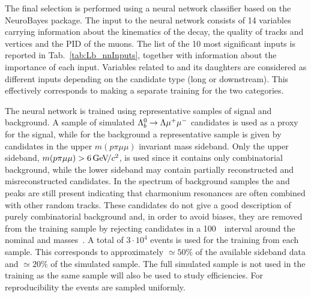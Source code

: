 The final selection is performed using a neural network classifier based on the NeuroBayes package.
 The input to the neural network consists of 14 variables carrying 
information about the kinematics of the decay, the quality of tracks and vertices and the PID of the muons.
The list of the 10 most significant inputs is reported in Tab.~\ref{tab:Lb_nnInputs}, together with information 
about the importance of each input.
%
%
%
Variables related to \Lz and its daughters are considered as different inputs depending on the
candidate type (long or downstream). This effectively corresponds to making a separate
training for the two categories. 

The neural network is trained using representative samples of signal and background.  A sample of simulated 
${{\Lambda}^0_{b}}\rightarrow{\ensuremath{\Lambda}}{\ensuremath{\mu^+\mu^-}}$ candidates is used as a proxy for the signal, while for the background a representative sample
is given by candidates in the upper $m(p\pi\mu\mu)$ invariant mass sideband. Only the upper sideband,
$m(p\pi\mu\mu) > 6 \gevcc$, is used since it contains only combinatorial background,
while the lower sideband may contain partially reconstructed and misreconstructed candidates.
In the \qsq spectrum of background samples the \jpsi and \psitwos peaks are still present indicating that charmonium
resonances are often combined with other random tracks. These candidates do not give a good description of purely
combinatorial background and, in order to avoid biases, they are removed from the training
sample by rejecting candidates in a 100~\mevcc~interval around the nominal \jpsi and \psitwos masses~\cite{PDG2014}.
A total of $3\cdot10^4$ events is used for the training from each sample. This corresponds to approximately
$\simeq 50\%$ of the available sideband data and $\simeq 20\%$ of the simulated sample. The full simulated sample 
is not used in the training as the same sample will also be used to study efficiencies. For reproducibility 
the events are sampled uniformly.

